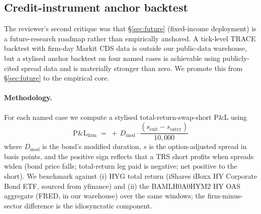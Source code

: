 \documentclass[11pt,a4paper]{article}
\begin{document}
\subsection{Credit-instrument anchor backtest}\label{sec:results_credit_anchor}

The reviewer's second critique was that §\ref{sec:future} (fixed-income deployment) is a future-research roadmap rather than empirically anchored. A tick-level TRACE backtest with firm-day Markit CDS data is outside our public-data warehouse, but a stylised anchor backtest on four named cases is achievable using publicly-cited spread data and is materially stronger than zero. We promote this from §\ref{sec:future} to the empirical core.

\paragraph{Methodology.} For each named case we compute a stylised total-return-swap-short P\&L using
\[
\text{P\&L}_{\text{firm}} \;=\; +\, D_{\text{mod}} \cdot \frac{(s_{\text{exit}} - s_{\text{entry}})}{10{,}000}
\]
where $D_{\text{mod}}$ is the bond's modified duration, $s$ is the option-adjusted spread in basis points, and the positive sign reflects that a TRS short profits when spreads widen (bond price falls; total-return leg paid is negative; net positive to the short). We benchmark against (i) HYG total return (iShares iBoxx HY Corporate Bond ETF, sourced from yfinance) and (ii) the BAMLH0A0HYM2 HY OAS aggregate (FRED, in our warehouse) over the same windows; the firm-minus-sector difference is the idiosyncratic component.
\end{document}
